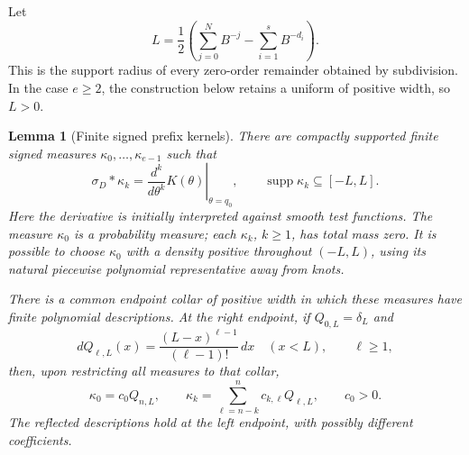 \documentclass[11pt,letterpaper]{article}
\newtheorem{lemma}[theorem]{Lemma}
\theoremstyle{definition}
\theoremstyle{remark}
\newcommand{\supp}{\operatorname{supp}}
\begin{document}
Let
\begin{equation}\label{upper:L}
 L=\frac12\left(\sum_{j=0}^N B^{-j}
                    -\sum_{i=1}^s B^{-d_i}\right).
\end{equation}
This is the support radius of every zero-order remainder obtained by
subdivision.  In the case $e\ge2$, the construction below retains a uniform
of positive width, so $L>0$.

\begin{lemma}[Finite signed prefix kernels]
\label{upper:kernels}
There are compactly supported finite signed measures
$\kappa_0,\ldots,\kappa_{e-1}$ such that
\begin{equation}\label{upper:kernel-identity}
 \sigma_D*\kappa_k
   =\left.\frac{d^k}{d\theta^k}K(\theta)\right|_{\theta=q_0},
 \qquad \supp\kappa_k\subseteq[-L,L].
\end{equation}
Here the derivative is initially interpreted against smooth test functions.
The measure $\kappa_0$ is a probability measure; each $\kappa_k$, $k\ge1$,
has total mass zero.  It is possible to choose $\kappa_0$ with a density
positive throughout $(-L,L)$, using its natural piecewise polynomial
representative away from knots.

There is a common endpoint collar of positive width in which these measures
have finite polynomial descriptions.  At the right endpoint, if
$Q_{0,L}=\delta_L$ and
\[
 dQ_{\ell,L}(x)
   =\frac{(L-x)^{\ell-1}}{(\ell-1)!}\,dx\quad(x<L),\qquad\ell\ge1,
\]
then, upon restricting all measures to that collar,
\begin{equation}\label{upper:endpoint-kernels}
 \kappa_0=c_0Q_{n,L},\qquad
 \kappa_k=\sum_{\ell=n-k}^{n}c_{k,\ell}Q_{\ell,L},
 \qquad c_0>0.
\end{equation}
The reflected descriptions hold at the left endpoint, with possibly
different coefficients.
\end{lemma}
\end{document}
